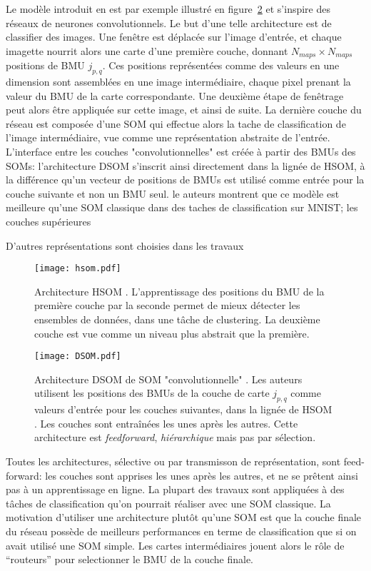 \documentclass[../main]{subfiles}
\begin{document}
Le modèle introduit en \cite{Liu2015DeepSM} est par exemple illustré en figure~\ref{fig:dsom} et s'inspire des réseaux de neurones convolutionnels.
Le but d'une telle architecture est de classifier des images. Une fenêtre est déplacée sur l'image d'entrée, et chaque imagette nourrit alors une carte d'une première couche, donnant $N_{maps}  \times N_{maps}$ positions de BMU $j_{p,q}$. Ces positions représentées comme des valeurs en une dimension sont assemblées en une image intermédiaire, chaque pixel prenant la valeur du BMU de la carte correspondante. Une deuxième étape de fenêtrage peut alors être appliquée sur cette image, et ainsi de suite. La dernière couche du réseau est composée d'une SOM qui effectue alors la tache de classification de l'image intermédiaire, vue comme une représentation abstraite  de l'entrée.
L'interface entre les couches "convolutionnelles" est créée à partir des BMUs des SOMs: l'architecture DSOM s'inscrit ainsi directement dans la lignée de HSOM, à la différence qu'un vecteur de positions de BMUs est utilisé comme entrée pour la couche suivante et non un BMU seul.
le auteurs montrent que ce modèle est meilleure qu'une SOM classique dans des taches de classification sur MNIST; les couches supérieures 

D'autres représentations sont choisies dans les travaux 

\begin{figure}
    \centering
    \texttt{[image: hsom.pdf]}
    \caption{Architecture HSOM \cite{lampinen_clustering_1992}. L'apprentissage des positions du BMU de la première couche par la seconde permet de mieux détecter les ensembles de données, dans une tâche de clustering. La deuxième couche est vue comme un niveau plus abstrait que la première. \label{fig:hsom}}
\end{figure}

\begin{figure}
    \texttt{[image: DSOM.pdf]}
    \caption{Architecture DSOM de SOM "convolutionnelle" \cite{liu_deep_2015}. Les auteurs utilisent les positions des BMUs de la couche de carte $j_{p,q}$ comme valeurs d'entrée pour les couches suivantes, dans la lignée de HSOM \cite{lampinen_clustering_1992}. Les couches sont entraînées les unes après les autres. Cette architecture est \emph{feedforward}, \emph{hiérarchique} mais pas par sélection. \label{fig:dsom}}
\end{figure}

Toutes les architectures, sélective ou par transmisson de représentation, sont feed-forward: les couches sont apprises les unes après les autres, et ne se prêtent ainsi pas à un apprentissage en ligne.
La plupart des travaux sont appliquées à des tâches de classification qu'on pourrait réaliser avec une SOM classique.
La motivation d'utiliser une architecture plutôt qu'une SOM est que la couche finale du réseau possède de meilleurs performances en terme de classification que si on avait utilisé une SOM simple. Les cartes intermédiaires jouent alors le rôle de “routeurs” pour selectionner le BMU de la couche finale.
\end{document}
